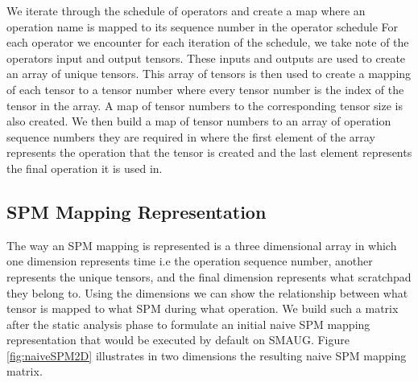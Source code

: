 



We iterate through the schedule of operators and create a map where an
operation name is mapped to its sequence number in the operator schedule
For each operator we encounter for each iteration
of the schedule, we take note of the operators input and output tensors. These inputs
and outputs are used to create an array of unique tensors. This array of
tensors is then used to create a mapping of each tensor to a tensor number
where every tensor number is the index of the tensor in the array. A map of 
tensor numbers to the corresponding tensor size is also created. We then
build a map of tensor numbers to an array of operation sequence numbers they are
required in where the first element of the array represents the operation that
the tensor is created and the last element represents the final operation
it is used in.



\subsection{SPM Mapping Representation}

The way an SPM mapping is represented is a three dimensional array in which one
dimension represents time i.e the operation sequence number, another represents
the unique tensors, and the final dimension represents what scratchpad they
belong to. Using the dimensions we can show the relationship between what tensor
is mapped to what SPM during what operation. We build such a matrix after the
static analysis phase to formulate an initial naive SPM mapping representation
that would be executed by default on SMAUG. Figure \ref{fig:naiveSPM2D}
illustrates in two dimensions the resulting naive SPM mapping matrix.


